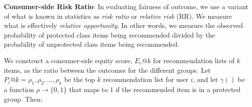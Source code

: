         
        
        
        
        
        

        
        
        
        \textbf{Consumer-side Risk Ratio}: In evaluating fairness of outcome, we use a variant of what is known in statistics as \textit{risk ratio} or \textit{relative risk} (RR)\cite{romei2014multidisciplinary}. We measure what is effectively \textit{relative opportunity}. In other words, we measure the observed probability of protected class items being recommended divided by the probability of unprotected class items being recommended.
        
        We construct a consumer-side equity score, $E_c@k$ for recommendation lists of $k$ items, as the ratio between the outcomes for the different groups. Let $P_i@k = {\rho_1, \rho_2, ..., \rho_k}$ be the top $k$ recommendation list for user $i$, and let $\gamma()$ be a function $\rho \rightarrow \{0,1\}$ that maps to 1 if the recommended item is in a protected group. Then:

